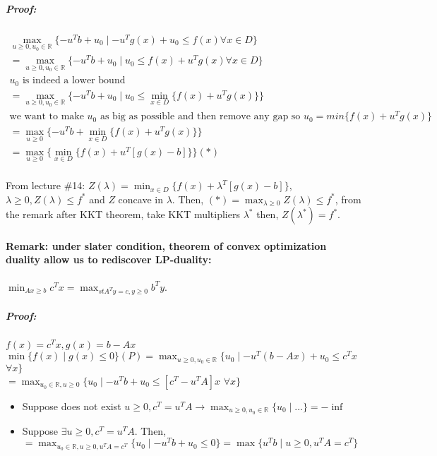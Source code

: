 \documentclass[main]{subfiles}
\begin{document}
\subparagraph{Proof:}

\begin{gather*}
\max_{u \geq 0, u_{0} \in \mathbb{R}} \{-u^{T}b + u_{0} \mid -u^{T}g(x) + u_{0}
\leq f(x) \forall x \in D \} \\
= \max_{u \geq 0, u_{0} \in \mathbb{R}} \{-u^{T}b + u_{0} \mid u_{0} \leq f(x)
+ u^{T}g(x) \forall x \in D \} \\
\text{$u_{0}$ is indeed a lower bound} \\
= \max_{u \geq 0, u_{0} \in \mathbb{R}} \{-u^{T}b + u_{0} \mid u_{0} \leq 
\min_{x \in D} \{f(x) + u^{T}g(x)\} \} \\
\text{we want to make $u_{0}$ as big as possible and then remove any gap so 
$u_{0} = min \{f(x) + u^{T}g(x)\}$ } \\
= \max_{u \geq 0} \{-u^{T}b + \min_{x \in D} \{f(x) + u^{T}g(x)\} \} \\
= \max_{u \geq 0} \{ \min_{x \in D} \{f(x) + u^{T}[g(x) -b] \} \} (*)\\
\end{gather*}

From lecture \#14: $Z(\lambda) = \min_{x \in D} \{f(x) + \lambda^{T}[g(x) -b]
\}$, $\lambda \geq 0, Z(\lambda) \leq f^{*}$ and $Z$ concave in $\lambda$.
Then, $(*) = \max_{\lambda \geq 0} Z(\lambda) \leq f^{*}$, from the remark
after KKT theorem, take KKT multipliers $\lambda^{*}$ then, $Z(\lambda^{*}) =
f^{*}$.

\paragraph{Remark: under slater condition, theorem of convex optimization 
duality allow us to rediscover LP-duality:}
$\displaystyle \min_{Ax \geq b} c^{T}x = \max_{st A^{T}y = c, y \geq 0}
b^{T}y$.

\subparagraph{Proof:}
$f(x) = c^{T}x, g(x) = b - Ax$\\
$\displaystyle \min \{f(x) \mid g(x) \leq 0 \} (P) = \max_{u \geq 0, u_{0} \in
\mathbb{R}} \{ u_{0} \mid -u^{T}(b-Ax) + u_{0} \leq c^{T}x$ $ \forall x \}$\\
$ = \displaystyle \max_{u_{0} \in \mathbb{R}, u \geq 0} \{ u_{0} \mid -u^{T}b +
u_{0} \leq [c^{T} - u^{T}A]x$ $\forall x \}$
\begin{itemize}
\item Suppose does not exist $u \geq 0, c^{T} = u^{T}A \rightarrow \max_{u \geq
0, u_{0} \in \mathbb{R}} \{ u_{0} \mid \dots \} = - \inf$
\item Suppose $\exists u \geq 0, c^{T} = u^{T}A$. Then, $ = \displaystyle
\max_{u_{0} \in \mathbb{R}, u \geq 0, u^{T}A = c^{T}} \{u_{0} \mid -u^{T}b +
u_{0} \leq 0 \} = \max \{ u^{T}b \mid u \geq 0, u^{T}A = c^{T} \}$
\end{itemize}
\end{document}
